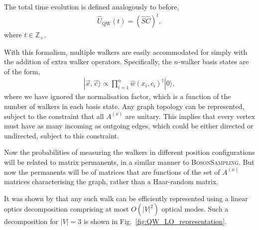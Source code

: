 \documentclass[aps, rmp, twocolumn, amsmath, amssymb, nofootinbib, superscriptaddress, longbibliography, floatfix, table-of-contents, eqsecnum]{revtex4-1}
\newcommand{\ket}[1]{|#1\rangle}
\begin{document}
The total time evolution is defined analogously to before,
\begin{align}
\hat{U}_\text{QW}(t) = (\hat{S}\hat{C})^t,
\end{align}
where \mbox{$t\in \mathbb{Z}_+$}.

With this formalism, multiple walkers are easily accommodated for simply with the addition of extra walker operators. Specifically, the $n$-walker basis states are of the form,
\begin{align}
\ket{\vec{x},\vec{c}} \propto \prod_{i=1}^n \hat{w}(x_i,c_i)^\dag \ket{0},
\end{align}
where we have ignored the normalisation factor, which is a function of the number of walkers in each basis state. Any graph topology can be represented, subject to the constraint that all $A^{(x)}$ are unitary. This implies that every vertex must have as many incoming as outgoing edges, which could be either directed or undirected, subject to this constraint.

Now the probabilities of measuring the walkers in different position configurations will be related to matrix permanents, in a similar manner to \textsc{BosonSampling}. But now the permanents will be of matrices that are functions of the set of $A^{(x)}$ matrices characterising the graph, rather than a Haar-random matrix.

It was shown by \cite{bib:RohdeMultiWalk11} that any such walk can be efficiently represented using a linear optics decomposition comprising at most $O(|V|^2)$ optical modes. Such a decomposition for \mbox{$|V|=3$} is shown in Fig.~\ref{fig:QW_LO_representation}.
\end{document}
